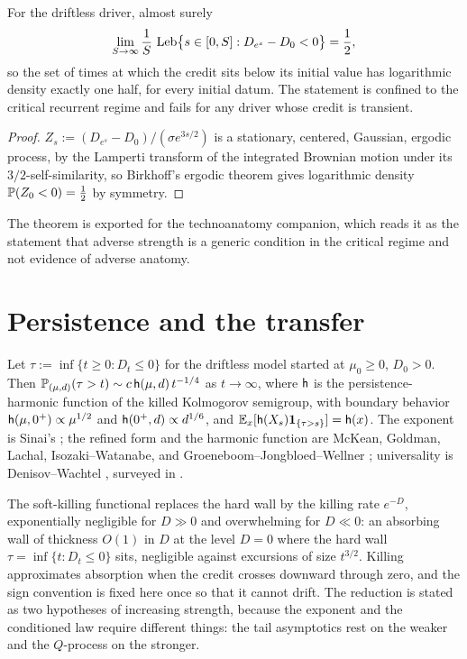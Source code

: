 \begin{theorem}\label{thm:half}
For the driftless driver, almost surely
\begin{equation}\label{eq:half}
\lim_{S\to\infty}\frac1S\,\operatorname{Leb}\bigl\{s\in[0,S]:D_{e^{s}}-D_0<0\bigr\}=\frac12,
\end{equation}
so the set of times at which the credit sits below its initial value
has logarithmic density exactly one half, for every initial datum. The
statement is confined to the critical recurrent regime and fails for
any driver whose credit is transient.
\end{theorem}

\begin{proof}
$Z_s:=(D_{e^{s}}-D_0)/(\sigma e^{3s/2})$ is a stationary, centered,
Gaussian, ergodic process, by the Lamperti transform of the integrated
Brownian motion under its $3/2$-self-similarity, so Birkhoff's ergodic
theorem gives logarithmic density $\mathbb{P}(Z_0<0)=\tfrac12$ by symmetry.
\end{proof}

\noindent The theorem is exported for the technoanatomy companion, which
reads it as the statement that adverse strength is a generic condition
in the critical regime and not evidence of adverse anatomy.

\section{Persistence and the transfer}\label{sec:persist}

\begin{theorem}
\label{thm:persist}
Let $\tau:=\inf\{t\ge0:D_t\le0\}$ for the driftless model started at
$\mu_0\ge0$, $D_0>0$. Then
$\mathbb{P}_{(\mu,d)}(\tau>t)\sim c\,\mathsf{h}(\mu,d)\,t^{-1/4}$ as $t\to\infty$,
where $\mathsf{h}$ is the persistence-harmonic function of the killed
Kolmogorov semigroup, with boundary behavior
$\mathsf{h}(\mu,0^+)\propto\mu^{1/2}$ and $\mathsf{h}(0^+,d)\propto d^{1/6}$, and
$\mathbb{E}_x[\mathsf{h}(X_s)\mathbf{1}_{\{\tau>s\}}]=\mathsf{h}(x)$. The exponent is Sinai's
\cite{Sin92}; the refined form and the harmonic function are
McKean, Goldman, Lachal, Isozaki--Watanabe, and
Groeneboom--Jongbloed--Wellner
\cite{McK63,Gol71,Lac91,IW94,GJW99}; universality is
Denisov--Wachtel \cite{DW15}, surveyed in \cite{AS15,BMS13}.
\end{theorem}

The soft-killing functional replaces the hard wall by the killing rate
$e^{-D}$, exponentially negligible for $D\gg0$ and overwhelming for
$D\ll0$: an absorbing wall of thickness $O(1)$ in $D$ at the level
$D=0$ where the hard wall $\tau=\inf\{t:D_t\le0\}$ sits, negligible
against excursions of size $t^{3/2}$. Killing approximates absorption
when the credit crosses downward through zero, and the sign convention
is fixed here once so that it cannot drift. The reduction is stated as two hypotheses of increasing strength,
because the exponent and the conditioned law require different
things: the tail asymptotics rest on the weaker and the $Q$-process
on the stronger.

